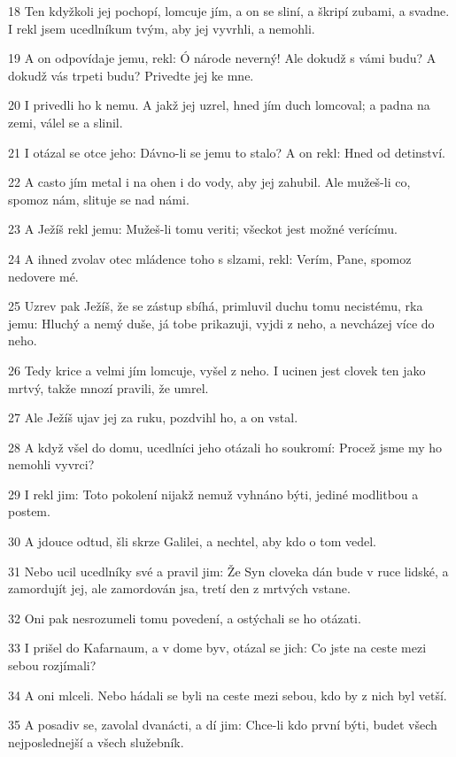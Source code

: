\par 18 Ten kdyžkoli jej pochopí, lomcuje jím, a on se sliní, a škripí zubami, a svadne. I rekl jsem ucedlníkum tvým, aby jej vyvrhli, a nemohli.
\par 19 A on odpovídaje jemu, rekl: Ó národe neverný! Ale dokudž s vámi budu? A dokudž vás trpeti budu? Privedte jej ke mne.
\par 20 I privedli ho k nemu. A jakž jej uzrel, hned jím duch lomcoval; a padna na zemi, válel se a slinil.
\par 21 I otázal se otce jeho: Dávno-li se jemu to stalo? A on rekl: Hned od detinství.
\par 22 A casto jím metal i na ohen i do vody, aby jej zahubil. Ale mužeš-li co, spomoz nám, slituje se nad námi.
\par 23 A Ježíš rekl jemu: Mužeš-li tomu veriti; všeckot jest možné verícímu.
\par 24 A ihned zvolav otec mládence toho s slzami, rekl: Verím, Pane, spomoz nedovere mé.
\par 25 Uzrev pak Ježíš, že se zástup sbíhá, primluvil duchu tomu necistému, rka jemu: Hluchý a nemý duše, já tobe prikazuji, vyjdi z neho, a nevcházej více do neho.
\par 26 Tedy krice a velmi jím lomcuje, vyšel z neho. I ucinen jest clovek ten jako mrtvý, takže mnozí pravili, že umrel.
\par 27 Ale Ježíš ujav jej za ruku, pozdvihl ho, a on vstal.
\par 28 A když všel do domu, ucedlníci jeho otázali ho soukromí: Procež jsme my ho nemohli vyvrci?
\par 29 I rekl jim: Toto pokolení nijakž nemuž vyhnáno býti, jediné modlitbou a postem.
\par 30 A jdouce odtud, šli skrze Galilei, a nechtel, aby kdo o tom vedel.
\par 31 Nebo ucil ucedlníky své a pravil jim: Že Syn cloveka dán bude v ruce lidské, a zamordujít jej, ale zamordován jsa, tretí den z mrtvých vstane.
\par 32 Oni pak nesrozumeli tomu povedení, a ostýchali se ho otázati.
\par 33 I prišel do Kafarnaum, a v dome byv, otázal se jich: Co jste na ceste mezi sebou rozjímali?
\par 34 A oni mlceli. Nebo hádali se byli na ceste mezi sebou, kdo by z nich byl vetší.
\par 35 A posadiv se, zavolal dvanácti, a dí jim: Chce-li kdo první býti, budet všech nejposlednejší a všech služebník.
